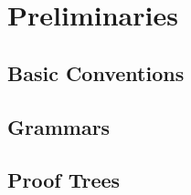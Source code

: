 \chapter{Preliminaries}

\section{Basic Conventions}

\section{Grammars}

\cite{Ford:2002}

\section{Proof Trees}

